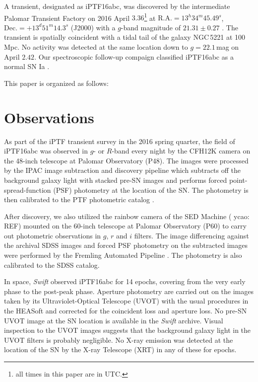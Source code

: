 \documentclass[twocolumn]{aastex61}
\newcommand{\ycao}[1]{{\color{red} ycao: {#1}}}
\begin{document}
A transient, designated as iPTF16abc, was discovered by the
intermediate Palomar Transient Factory on 2016 April
$3.36$\footnote{all times in this paper are in UTC.} at
$\textrm{R.A.}=13^h34^m45.49^s$, $\textrm{Dec.}=+13^d51^m14.3^s$
(J2000) with a $g$-band magnitude of $21.31\pm0.27$
\citep{2016PASP..128k4502C,2016ATel.8907....1M}. The transient is
spatially coincident with a tidal tail of the galaxy NGC\,5221 at
100\,Mpc. No activity was detected at the same location down to
$g=22.1$\,mag on April $2.42$. Our spectroscopic follow-up compaign
classified iPTF16abc as a normal SN Ia \citep{2016ATel.8909....1C}.

This paper is organized as follows:

\section{Observations}
\label{sec:obs}

As part of the iPTF transient survey in the 2016 spring quarter, the
field of iPTF16abc was observed in $g$- or $R$-band every night by the
CFH12K camera \citep{2000SPIE.3965...58S} on the 48-inch telescope at
Palomar Observatory (P48). The images were processed by the IPAC image
subtraction and discovery pipeline which subtracts off the background
galaxy light with stacked pre-SN images and performs forced
point-spread-function (PSF) photometry at the location of the SN. The
photometry is then calibrated to the PTF photometric catalog
\citep{2012PASP..124..854O}.

After discovery, we also utilized the rainbow camera of the SED
Machine (\ycao{REF}) mounted on the 60-inch telescope at Palomar
Observatory (P60) to carry out photometric observations in $g$, $r$
and $i$ filters. The image differencing against the archival SDSS
images and forced PSF photometry on the subtracted images were
performed by the Fremling Automated Pipeline
\citep{2016A&A...593A..68F}. The photometry is also calibrated to the
SDSS catalog.

In space, \textit{Swift} observed iPTF16abc for 14 epochs, covering
from the very early phase to the post-peak phase. Aperture photometry
are carried out on the images taken by its Ultraviolet-Optical
Telescope (UVOT) with the usual procedures in the HEASoft and
corrected for the coincident loss and aperture loss. No pre-SN UVOT
image at the SN location is available in the \textit{Swift} archive.
Visual inspection to the UVOT images suggests that the background
galaxy light in the UVOT filters is probably negligible. No X-ray
emission was detected at the location of the SN by the X-ray Telescope
(XRT) in any of these for epochs.
\end{document}
